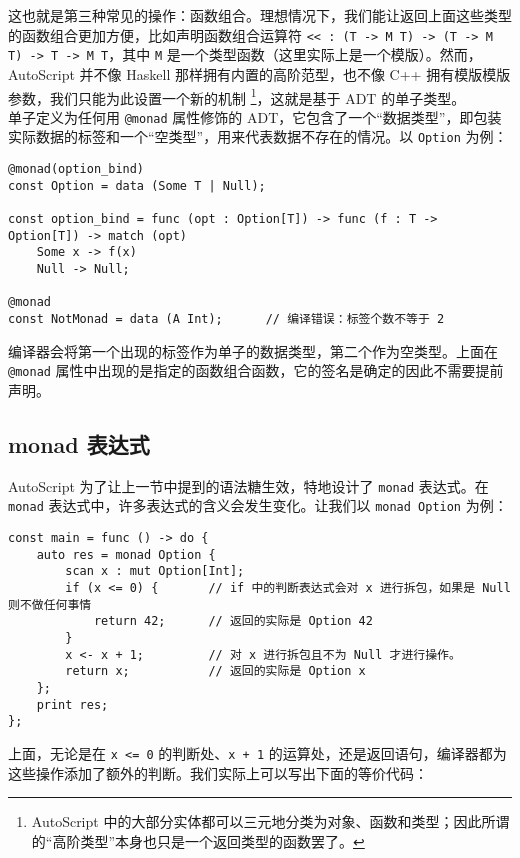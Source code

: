 这也就是第三种常见的操作：函数组合。理想情况下，我们能让返回上面这些类型的函数组合更加方便，比如声明函数组合运算符 \lstinline!<< : (T -> M T) -> (T -> M T) -> T -> M T!，其中 \lstinline!M! 是一个类型函数（这里实际上是一个模版）。然而，AutoScript 并不像 Haskell 那样拥有内置的高阶范型，也不像 C++ 拥有模版模版参数，我们只能为此设置一个新的机制 \footnote{AutoScript 中的大部分实体都可以三元地分类为对象、函数和类型；因此所谓的“高阶类型”本身也只是一个返回类型的函数罢了。}，这就是基于 ADT 的单子类型。 \\

单子定义为任何用 \lstinline!@monad! 属性修饰的 ADT，它包含了一个“数据类型”，即包装实际数据的标签和一个“空类型”，用来代表数据不存在的情况。以 \lstinline!Option! 为例：

\begin{lstlisting}
@monad(option_bind)
const Option = data (Some T | Null);

const option_bind = func (opt : Option[T]) -> func (f : T -> Option[T]) -> match (opt)
	Some x -> f(x)
	Null -> Null;

@monad
const NotMonad = data (A Int);		// 编译错误：标签个数不等于 2
\end{lstlisting}

编译器会将第一个出现的标签作为单子的数据类型，第二个作为空类型。上面在 \lstinline!@monad! 属性中出现的是指定的函数组合函数，它的签名是确定的因此不需要提前声明。

\subsection{monad 表达式}

AutoScript 为了让上一节中提到的语法糖生效，特地设计了 \lstinline!monad! 表达式。在 \lstinline!monad! 表达式中，许多表达式的含义会发生变化。让我们以 \lstinline!monad Option! 为例：

\begin{lstlisting}
const main = func () -> do {
	auto res = monad Option {
		scan x : mut Option[Int];
		if (x <= 0) {		// if 中的判断表达式会对 x 进行拆包，如果是 Null 则不做任何事情
			return 42;		// 返回的实际是 Option 42
		}
		x <- x + 1;			// 对 x 进行拆包且不为 Null 才进行操作。
		return x;			// 返回的实际是 Option x
	};
	print res;
};
\end{lstlisting}

上面，无论是在 \lstinline!x <= 0! 的判断处、\lstinline!x + 1! 的运算处，还是返回语句，编译器都为这些操作添加了额外的判断。我们实际上可以写出下面的等价代码：

